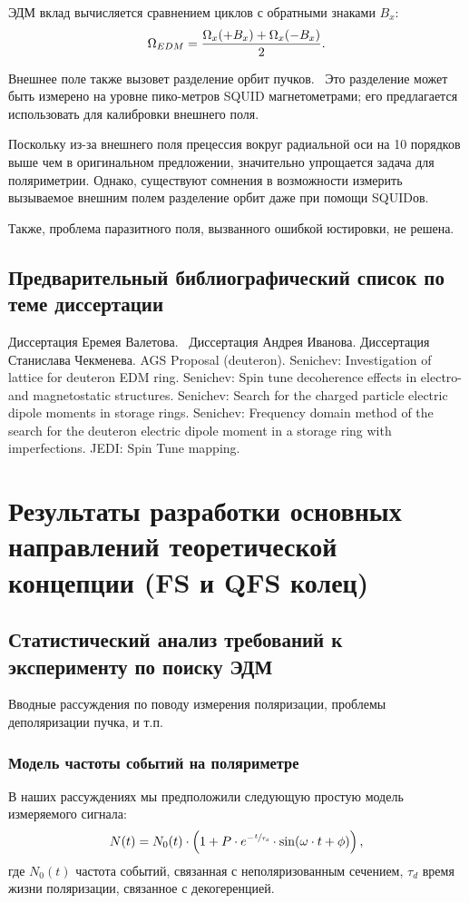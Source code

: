 \documentclass{report}
\newcommand{\LTd}{\tau_d}
\begin{document}
ЭДМ вклад вычисляется сравнением циклов с обратными знаками $B_x$:~\citep[стр.~1963]{Koop:IPAC13}
\[
\Omega_{EDM} = \frac{\Omega_x(+B_x) + \Omega_x(-B_x)}{2}.
\]

Внешнее поле также вызовет разделение орбит
пучков.~\citep[стр.~1963]{Koop:IPAC13} Это разделение может быть
измерено на уровне пико-метров SQUID магнетометрами; его предлагается
использовать для калибровки внешнего поля.

Поскольку из-за внешнего поля прецессия вокруг радиальной оси на 10
порядков выше чем в оригинальном предложении, значительно упрощается
задача для поляриметрии. Однако, существуют сомнения в возможности
измерить вызываемое внешним полем разделение орбит даже при помощи SQUIDов.

Также, проблема паразитного поля, вызванного ошибкой юстировки, не решена.


\section{Предварительный библиографический список по теме диссертации}
Диссертация Еремея Валетова.~\citep[стр.~235]{Eremey:Thesis}
Диссертация Андрея Иванова.
Диссертация Станислава Чекменева.
AGS Proposal (deuteron).
Senichev: Investigation of lattice for deuteron EDM ring.
Senichev: Spin tune decoherence effects in electro- and magnetostatic structures.
Senichev: Search for the charged particle electric dipole moments in storage rings.
Senichev: Frequency domain method of the search for the deuteron electric dipole moment in a storage ring with imperfections.
JEDI: Spin Tune mapping.


\chapter{Результаты разработки основных направлений теоретической концепции (FS и QFS колец)}
\section{Статистический анализ требований к эксперименту по поиску
  ЭДМ}

Вводные рассуждения по поводу измерения поляризации, проблемы
деполяризации пучка, и т.п.

\subsection{Модель частоты событий на поляриметре}
В наших рассуждениях мы предположили следующую простую модель
измеряемого сигнала:
\begin{equation}\label{eq:DetCntRt}
	N(t) = N_0(t)\cdot\bkt{1 + P\cdot e^{-\sfrac{t}{\LTd}}\cdot\sin(\omega\cdot t + \phi)},
\end{equation}
где $N_0(t)$ частота событий, связанная с неполяризованным сечением,
$\LTd$ время жизни поляризации, связанное с декогеренцией.
\end{document}
